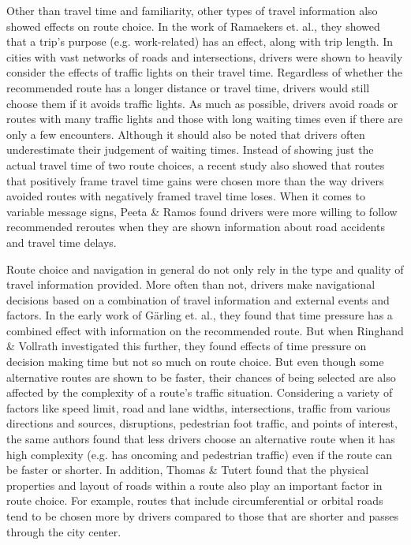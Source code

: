 Other than travel time and familiarity, other types of travel information also showed effects on route choice. In the work of Ramaekers et. al., they showed that a trip's purpose (e.g. work-related) has an effect, along with trip length\cite{ramaekers2013modelling}. In cities with vast networks of roads and intersections, drivers were shown to heavily consider the effects of traffic lights on their travel time. Regardless of whether the recommended route has a longer distance or travel time, drivers would still choose them if it avoids traffic lights\cite{abdel2004modeling,papinski2009exploring,palat2014numerosity,venigalla2017psychology,Ringhand2017InvestigatingTime,ringhand2018make}. As much as possible, drivers avoid roads or routes with many traffic lights \cite{palat2014numerosity} and those with long waiting times even if there are only a few encounters\cite{Ringhand2017InvestigatingTime}. Although it should also be noted that drivers often underestimate their judgement of waiting times\cite{wu2009perception}. Instead of showing just the actual travel time of two route choices, a recent study also showed that routes that positively frame travel time gains were chosen more than the way drivers avoided routes with negatively framed travel time loses\cite{ringhand2019faster}. When it comes to variable message signs, Peeta \& Ramos found drivers were more willing to follow recommended reroutes when they are shown information about road accidents and travel time delays\cite{peeta2006driver}.

Route choice and navigation in general do not only rely in the type and quality of travel information provided. More often than not, drivers make navigational decisions based on a combination of travel information and external events and factors. In the early work of Gärling et. al., they found that time pressure has a combined effect with information on the recommended route\cite{garling1999role}. But when Ringhand \& Vollrath investigated this further, they found effects of time pressure on decision making time but not so much on route choice\cite{Ringhand2017InvestigatingTime}. But even though some alternative routes are shown to be faster, their chances of being selected are also affected by the  complexity of a route's traffic situation. Considering a variety of factors like speed limit, road and lane widths, intersections, traffic from various directions and sources, disruptions, pedestrian foot traffic, and points of interest, the same authors found that less drivers choose an alternative route when it has high complexity (e.g. has oncoming and pedestrian traffic) even if the route can be faster or shorter\cite{ringhand2019effect}. In addition, Thomas \& Tutert found that the physical properties and layout of roads within a route also play an important factor in route choice\cite{thomas2015route}. For example, routes that include circumferential or orbital roads tend to be chosen more by drivers compared to those that are shorter and passes through the city center.  

